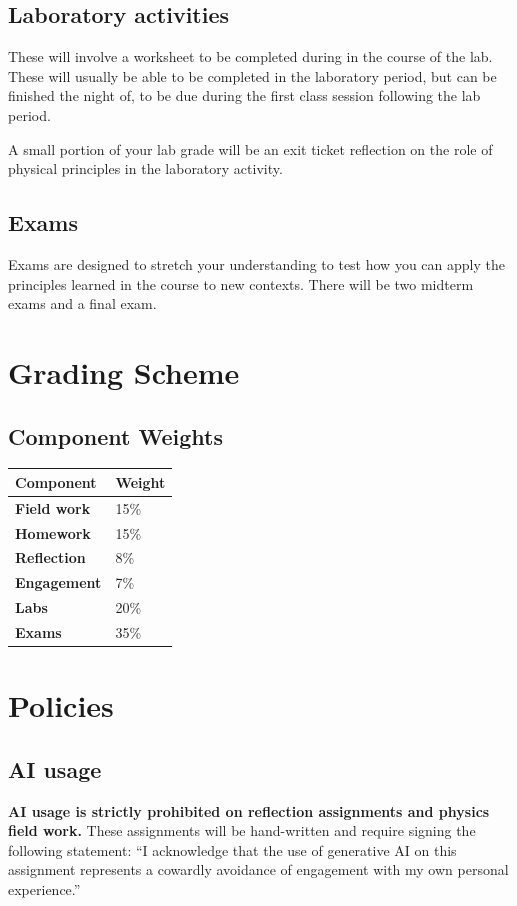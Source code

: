 \documentclass{syllabus}
\begin{document}
\subsection{Laboratory activities}
These will involve a worksheet to be completed during in the course of the lab. These will usually be able to be completed in the laboratory period, but can be finished the night of, to be due during the first class session following the lab period. 

A small portion of your lab grade will be an exit ticket reflection on the role of physical principles in the laboratory activity.

\subsection{Exams}
Exams are designed to stretch your understanding to test how you can apply the principles learned in the course to new contexts. There will be two midterm exams and a final exam.

\section*{Grading Scheme}
\subsection*{Component Weights}

\noindent\begin{tabular}{ll}
\textbf{Component} & \textbf{Weight}       \\ \hline
\textbf{Field work}             & 15\%  \\
\textbf{Homework}               & 15\%       \\
\textbf{Reflection}             &  8\%   \\
\textbf{Engagement}             &  7\%       \\
\textbf{Labs}                   & 20\% \\
\textbf{Exams}                  & 35\%
\end{tabular}%


\section*{Policies}
\subsection{AI usage}
\textbf{AI usage is strictly prohibited on reflection assignments and physics field work.} These assignments will be hand-written and require signing the following statement: ``I acknowledge that the use of generative AI on this assignment represents a cowardly avoidance of engagement with my own personal experience.'' 
\end{document}
